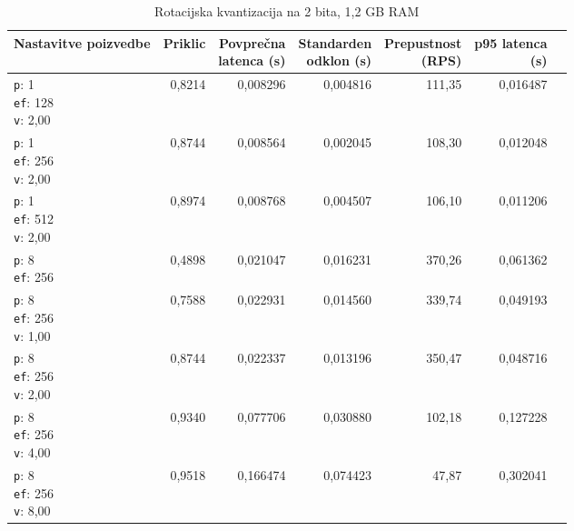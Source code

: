 \begin{table}[htbp]
  \centering
\small
  \caption{Rotacijska kvantizacija na 2 bita, 1,2 GB RAM}
  \label{tab:single-2cpu-1.2ram:tq2:qdrant-dipl-baseline-tenant-subgraph-tq2-ext-m16-ef-128-random-768-100-tenants-extended-upload-2026-08-19-08-33-21.json}
  \begin{tabularx}{\textwidth}{Xrrrrrr}
    \toprule
    Nastavitve poizvedbe & Priklic & \makecell{Povprečna\\latenca (s)} & \makecell{Standarden\\odklon (s)} & \makecell{Prepustnost\\(RPS)} & \makecell{p95 latenca\\(s)}  \\
    \midrule
    \makecell{\texttt{p}: 1\\\texttt{ef}: 128\\\texttt{v}: 2,00} & 0,8214 & 0,008296 & 0,004816 & 111,35 & 0,016487 \\
    \makecell{\texttt{p}: 1\\\texttt{ef}: 256\\\texttt{v}: 2,00} & 0,8744 & 0,008564 & 0,002045 & 108,30 & 0,012048 \\
    \makecell{\texttt{p}: 1\\\texttt{ef}: 512\\\texttt{v}: 2,00} & 0,8974 & 0,008768 & 0,004507 & 106,10 & 0,011206 \\
    \makecell{\texttt{p}: 8\\\texttt{ef}: 256} & 0,4898 & 0,021047 & 0,016231 & 370,26 & 0,061362 \\
    \makecell{\texttt{p}: 8\\\texttt{ef}: 256\\\texttt{v}: 1,00} & 0,7588 & 0,022931 & 0,014560 & 339,74 & 0,049193 \\
    \makecell{\texttt{p}: 8\\\texttt{ef}: 256\\\texttt{v}: 2,00} & 0,8744 & 0,022337 & 0,013196 & 350,47 & 0,048716 \\
    \makecell{\texttt{p}: 8\\\texttt{ef}: 256\\\texttt{v}: 4,00} & 0,9340 & 0,077706 & 0,030880 & 102,18 & 0,127228 \\
    \makecell{\texttt{p}: 8\\\texttt{ef}: 256\\\texttt{v}: 8,00} & 0,9518 & 0,166474 & 0,074423 & 47,87 & 0,302041 \\

\end{tabularx}
\end{table}
